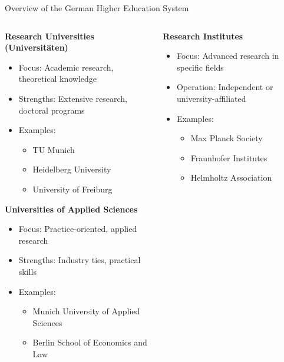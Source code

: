 \documentclass[10pt]{beamer}
\begin{document}
\begin{frame}[fragile]{Overview of the German Higher Education System}
    \begin{columns}[T]
        \begin{column}{0.5\textwidth}
            \textbf{Research Universities (Universitäten)}
            \begin{itemize}
                \item Focus: Academic research, theoretical knowledge
                \item Strengths: Extensive research, doctoral programs
                \item Examples: 
                    \begin{itemize}
                        \item TU Munich
                        \item Heidelberg University
                        \item University of Freiburg
                    \end{itemize}
            \end{itemize}
            
            \vspace{0.5cm}
            
            \textbf{Universities of Applied Sciences}
            \begin{itemize}
                \item Focus: Practice-oriented, applied research
                \item Strengths: Industry ties, practical skills
                \item Examples:
                    \begin{itemize}
                        \item Munich University of Applied Sciences
                        \item Berlin School of Economics and Law
                    \end{itemize}
            \end{itemize}
        \end{column}
        
        \begin{column}{0.5\textwidth}
            \textbf{Research Institutes}
            \begin{itemize}
                \item Focus: Advanced research in specific fields
                \item Operation: Independent or university-affiliated
                \item Examples:
                    \begin{itemize}
                        \item Max Planck Society
                        \item Fraunhofer Institutes
                        \item Helmholtz Association
                    \end{itemize}
            \end{itemize}
            

\end{column}
\end{columns}
\end{frame}
\end{document}
